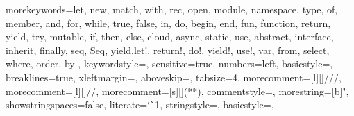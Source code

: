 %
{morekeywords={let, new, match, with, rec, open, module, namespace, type, of, member, %
and, for, while, true, false, in, do, begin, end, fun, function, return, yield, try, %
mutable, if, then, else, cloud, async, static, use, abstract, interface, inherit, finally,%
seq, Seq, yield,let!, return!, do!, yield!, use!, var, from, select, where, order, by },
  keywordstyle=\color{blue},
  sensitive=true,
  numbers=left,
  basicstyle=\ttfamily,
	breaklines=true,
  xleftmargin=\parindent,
  aboveskip=\bigskipamount,
	tabsize=4,
  morecomment=[l][\color{darkgreen}]{///},
  morecomment=[l][\color{darkgreen}]{//},
  morecomment=[s][\color{darkgreen}]{{(*}{*)}},
  commentstyle=\color{green}\ttfamily,
  morestring=[b]",
  showstringspaces=false,
  literate={`}{\`}1,
  stringstyle=\color{red},
  basicstyle=\scriptsize,
}

